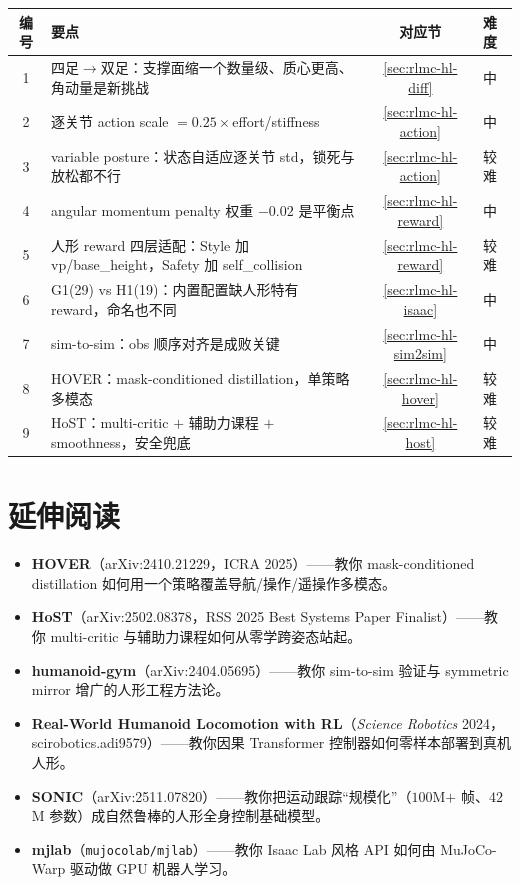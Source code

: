 \begin{center}
\small
\begin{tabular}{clcl}
\hline
编号 & 要点 & 对应节 & 难度 \\
\hline
1 & 四足$\to$双足：支撑面缩一个数量级、质心更高、角动量是新挑战 & \cref{sec:rlmc-hl-diff} & 中 \\
2 & 逐关节 action scale $=0.25\times$effort/stiffness & \cref{sec:rlmc-hl-action} & 中 \\
3 & variable posture：状态自适应逐关节 std，锁死与放松都不行 & \cref{sec:rlmc-hl-action} & 较难 \\
4 & angular momentum penalty 权重 $-0.02$ 是平衡点 & \cref{sec:rlmc-hl-reward} & 中 \\
5 & 人形 reward 四层适配：Style 加 vp/base\_height，Safety 加 self\_collision & \cref{sec:rlmc-hl-reward} & 较难 \\
6 & G1(29) vs H1(19)：内置配置缺人形特有 reward，命名也不同 & \cref{sec:rlmc-hl-isaac} & 中 \\
7 & sim-to-sim：obs 顺序对齐是成败关键 & \cref{sec:rlmc-hl-sim2sim} & 中 \\
8 & HOVER：mask-conditioned distillation，单策略多模态 & \cref{sec:rlmc-hl-hover} & 较难 \\
9 & HoST：multi-critic $+$ 辅助力课程 $+$ smoothness，安全兜底 & \cref{sec:rlmc-hl-host} & 较难 \\
\hline
\end{tabular}
\end{center}

\section*{延伸阅读}

\begin{itemize}
  \item \textbf{HOVER}（arXiv:2410.21229，ICRA 2025）\cite{he2025hover}——教你 mask-conditioned distillation 如何用一个策略覆盖导航/操作/遥操作多模态。
  \item \textbf{HoST}（arXiv:2502.08378，RSS 2025 Best Systems Paper Finalist）\cite{huang2025host}——教你 multi-critic 与辅助力课程如何从零学跨姿态站起。
  \item \textbf{humanoid-gym}（arXiv:2404.05695）\cite{gu2024humanoidgym}——教你 sim-to-sim 验证与 symmetric mirror 增广的人形工程方法论。
  \item \textbf{Real-World Humanoid Locomotion with RL}（\emph{Science Robotics} 2024，scirobotics.adi9579）\cite{radosavovic2024humanoid}——教你因果 Transformer 控制器如何零样本部署到真机人形。
  \item \textbf{SONIC}（arXiv:2511.07820）\cite{luo2025sonic}——教你把运动跟踪“规模化”（$100$M$+$ 帧、$42$M 参数）成自然鲁棒的人形全身控制基础模型。
  \item \textbf{mjlab}（\texttt{mujocolab/\allowbreak mjlab}）\cite{mjlab2026}——教你 Isaac Lab 风格 API 如何由 MuJoCo-Warp 驱动做 GPU 机器人学习。
\end{itemize}

